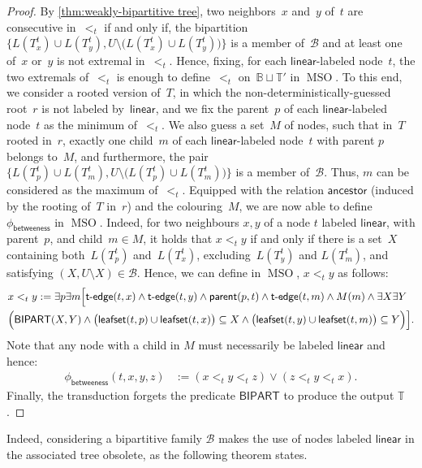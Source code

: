 \documentclass{lmcs} %
\newcommand{\MSO}{\ensuremath{\operatorname{MSO}}\xspace}
\newcommand{\ancestor}{\mathsf{ancestor}}
\newcommand{\betweeness}{\mathsf{betweeness}}
\newcommand{\parent}{\ensuremath{\mathsf{parent}}\xspace}
\newcommand{\tedge}{\ensuremath{\mathsf{t}\text-\mathsf{edge}}\xspace}
\newcommand{\BIPARTITION}{\ensuremath{\mathsf{BIPART}}\xspace}
\newcommand{\leafset}{\ensuremath{\mathsf{leafset}}\xspace}
\newcommand\LINEAR{\ensuremath{\mathsf{linear}}\xspace}
\newcommand{\ifof}{if and only if\xspace}
\begin{document}
\begin{proof}
    By \autoref{thm:weakly-bipartitive tree}, two neighbors~$x$ and~$y$ of~$t$ are consecutive in~$<_t$
    \ifof, the bipartition $\big\{L(T^t_x)\cup L(T^t_y),U\setminus\big(L(T^t_x)\cup L(T^t_y)\big)\big\}$ is a member of~$\mathcal{B}$
    and at least one of~$x$ or~$y$ is not extremal in~$<_t$.
    Hence, fixing, for each $\LINEAR$-labeled node~$t$,
    the two extremals of~$<_t$ is enough to define~$<_t$ on~$\mathbb{B}\sqcup\mathbb{T'}$ in \MSO.
    To this end, we consider a rooted version of~$T$,
    in which the non-deterministically-guessed root~$r$ is not labeled by~$\LINEAR$,
    and we fix the parent~$p$ of each $\LINEAR$-labeled node~$t$ as the minimum of~$<_t$.
    We also guess a set~$M$ of nodes, such that in~$T$ rooted in~$r$,
    exactly one child~$m$ of each $\LINEAR$-labeled node~$t$ with parent $p$
    belongs to~$M$, and furthermore, the pair $\big\{L(T^t_p)\cup L(T^t_m),U\setminus\big(L(T^t_p)\cup L(T^t_m)\big)\big\}$ is a member of~$\mathcal{B}$.
    Thus, $m$ can be considered as the maximum of~$<_t$.
    Equipped with the relation $\ancestor$ (induced by the rooting of~$T$ in~$r$)
    and the colouring~$M$, we are now able to define $\phi_{\betweeness}$ in \MSO.
    Indeed, for two neighbours $x,y$ of a node $t$ labeled $\LINEAR$, with parent~$p$, and child~$m\in M$, it holds that $x<_t y$ \ifof
    there is a set~$X$ containing both~$L(T_p^t)$ and~$L(T_x^t)$, excluding~$L(T_y^t)$ and $L(T_m^t)$, and satisfying $(X,U\setminus X)\in\mathcal{B}$.
    Hence, we can define in \MSO, $x<_t y$ as follows:
    \begin{align*}
        &x<_t y:=\exists p \exists m \Big[\tedge(t,x)\land\tedge(t,y)\land
            \parent(p,t)\land \tedge(t,m) \land M(m) \land
             \exists X\exists Y
             \\*
            &\Big(\BIPARTITION(X,Y)\land\big(\leafset(t,p)\cup \leafset(t,x)\big)\subseteq X\land \big(\leafset(t,y)\cup \leafset(t,m)\big)\subseteq Y\Big)\Big].
    \end{align*}
    Note that any node with a child in $M$ must necessarily be labeled $\LINEAR$ and hence:
    \begin{align*}
        \phi_{\betweeness}(t,x,y,z)&:= (x<_t y<_t z)\lor(z<_t y<_t x).
    \end{align*}
    Finally, the transduction forgets the predicate $\BIPARTITION$ to produce the output $\mathbb{T}$.
\end{proof}
Indeed, considering a bipartitive family $\mathcal{B}$ makes the use of nodes labeled $\LINEAR$ in the associated tree obsolete, as the following theorem states.
\end{document}
